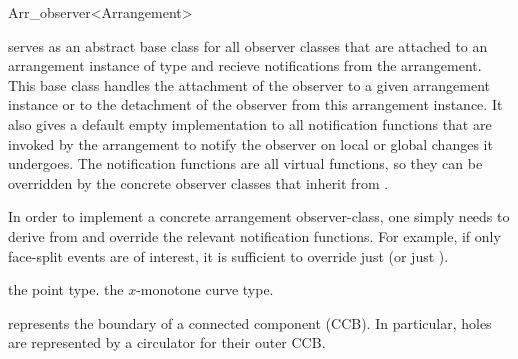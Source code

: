 
\ccRefPageBegin

\begin{ccRefClass}{Arr_observer<Arrangement>}
\label{arr_ref:arr_obs}

\ccDefinition

\ccClassTemplateName{} serves as an abstract base class for all observer
classes that are attached to an arrangement instance of type 
and recieve notifications from the arrangement.
This base class handles the attachment of the
observer to a given arrangement instance or to the detachment of the
observer from this arrangement instance. It also gives a default empty
implementation to all notification functions that are invoked by the
arrangement to notify the observer on local or global changes it undergoes.
The notification functions are all virtual functions, so they can be
overridden by the concrete observer classes that inherit from
\ccClassTemplateName.

In order to implement a concrete arrangement observer-class, one simply
needs to derive from \ccClassTemplateName{} and override the relevant
notification functions. For example, if only face-split events are of
interest, it is sufficient to override just  
(or just ).


\ccTypes


    {the point type.}
\ccGlue
{}
    {the $x$-monotone curve type.}

\ccGlue
{}
\ccGlue
{}
\ccGlue
{}
    {represents the boundary of a connected component (CCB).
     In particular, holes are represented by a circulator for their outer CCB.}


\end{ccRefClass}

